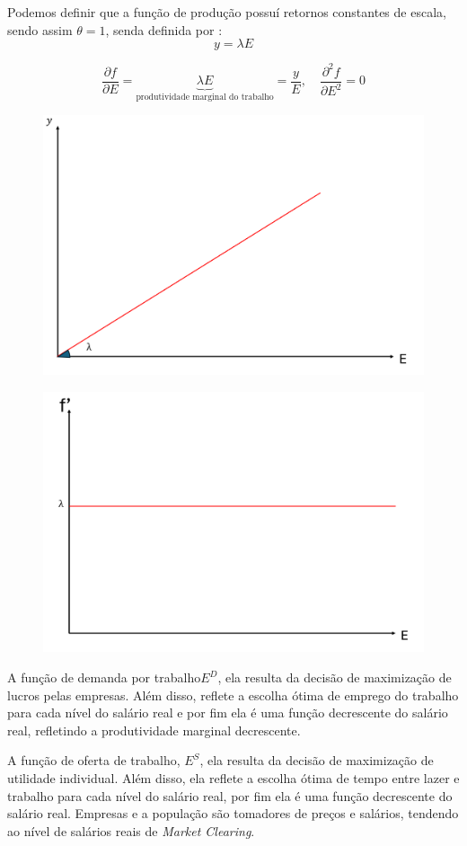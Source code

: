 \documentclass[a4paper,12pt]{article}[abntex2]
\begin{document}
Podemos definir que a função de produção possuí retornos constantes de escala, sendo assim \(\theta =1\), senda definida por :
\[
y=\lambda E
\]

\[
\frac{\partial f}{\partial E}=\underbrace{\lambda E}_{\text{produtividade marginal do trabalho}} =\frac{y}{E}, \quad \frac{\partial^2 f}{\partial E^2}=0
\]

\begin{figure}[H]
    \centering
    \includegraphics[width=0.7\linewidth]{Imagens/a5i10.png}
\end{figure}

\begin{figure}[H]
    \centering
    \includegraphics[width=0.7\linewidth]{Imagens/a5i11.png}
\end{figure}

A função de demanda por trabalho\(E^D\), ela resulta da decisão de maximização de lucros pelas empresas. Além disso, reflete a escolha ótima de emprego do trabalho para cada nível do salário real e por fim ela é uma função decrescente do salário real, refletindo a produtividade marginal decrescente.

A função de oferta de trabalho, $E^S$, ela resulta da decisão de maximização de utilidade individual. Além disso, ela reflete a escolha ótima de tempo entre lazer e trabalho para cada nível do salário real, por fim ela é uma função decrescente do salário real. Empresas e a população são tomadores de preços e salários, tendendo ao nível de salários reais de \textit{Market Clearing}.
\end{document}
